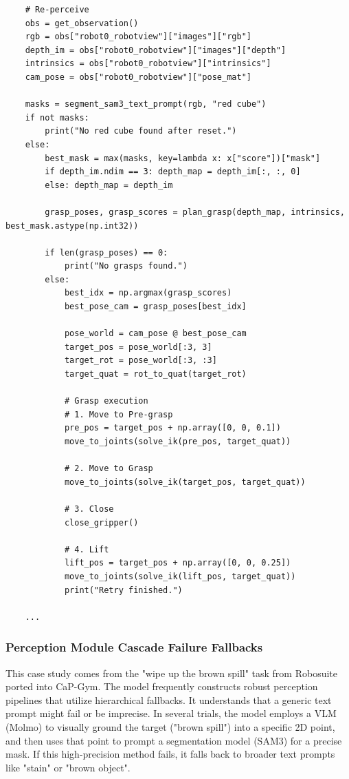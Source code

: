 \begin{lstlisting}
    # Re-perceive
    obs = get_observation()
    rgb = obs["robot0_robotview"]["images"]["rgb"]
    depth_im = obs["robot0_robotview"]["images"]["depth"]
    intrinsics = obs["robot0_robotview"]["intrinsics"]
    cam_pose = obs["robot0_robotview"]["pose_mat"]
    
    masks = segment_sam3_text_prompt(rgb, "red cube")
    if not masks:
        print("No red cube found after reset.")
    else:
        best_mask = max(masks, key=lambda x: x["score"])["mask"]
        if depth_im.ndim == 3: depth_map = depth_im[:, :, 0]
        else: depth_map = depth_im
        
        grasp_poses, grasp_scores = plan_grasp(depth_map, intrinsics, best_mask.astype(np.int32))
        
        if len(grasp_poses) == 0:
            print("No grasps found.")
        else:
            best_idx = np.argmax(grasp_scores)
            best_pose_cam = grasp_poses[best_idx]
            
            pose_world = cam_pose @ best_pose_cam
            target_pos = pose_world[:3, 3]
            target_rot = pose_world[:3, :3]
            target_quat = rot_to_quat(target_rot)
            
            # Grasp execution
            # 1. Move to Pre-grasp
            pre_pos = target_pos + np.array([0, 0, 0.1])
            move_to_joints(solve_ik(pre_pos, target_quat))
            
            # 2. Move to Grasp
            move_to_joints(solve_ik(target_pos, target_quat))
            
            # 3. Close
            close_gripper()
            
            # 4. Lift
            lift_pos = target_pos + np.array([0, 0, 0.25])
            move_to_joints(solve_ik(lift_pos, target_quat))
            print("Retry finished.")

    ...
\end{lstlisting}
\subsubsection{Perception Module Cascade Failure Fallbacks}
\label{app:perception_fallbacks}
This case study comes from the "wipe up the brown spill" task from Robosuite ported into CaP-Gym. The model frequently constructs robust perception pipelines that utilize hierarchical fallbacks. It understands that a generic text prompt might fail or be imprecise. In several trials, the model employs a VLM (Molmo) to visually ground the target ("brown spill") into a specific 2D point, and then uses that point to prompt a segmentation model (SAM3) for a precise mask. If this high-precision method fails, it falls back to broader text prompts like "stain" or "brown object".

